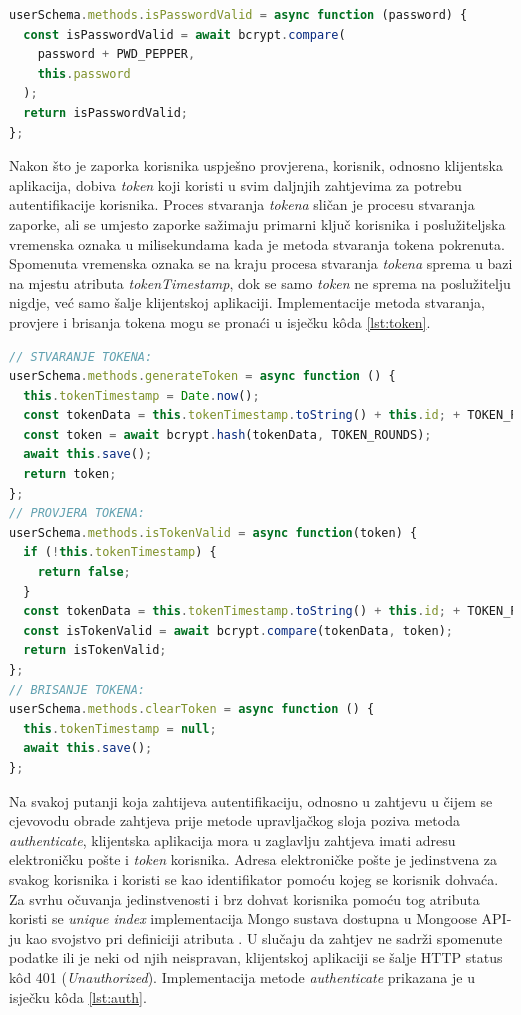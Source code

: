 \documentclass[times, utf8, diplomski, numeric]{fer}
\newcommand{\razmakp}{\vspace{18pt}}
\newcommand{\razmaks}{\vspace{10pt}}
\begin{document}
\razmakp %
\begin{lstlisting}[language=JavaScript, caption={Metoda \emph{isPasswordValid} sheme Korisnik}, label={lst:isPwd}]
userSchema.methods.isPasswordValid = async function (password) {
  const isPasswordValid = await bcrypt.compare(
    password + PWD_PEPPER,
    this.password
  );
  return isPasswordValid;
};
\end{lstlisting}
\razmaks

Nakon što je zaporka korisnika uspješno provjerena, korisnik, odnosno klijentska aplikacija, dobiva \emph{token} koji koristi u svim daljnjih zahtjevima za potrebu autentifikacije korisnika.
Proces stvaranja \emph{tokena} sličan je procesu stvaranja zaporke, ali se umjesto zaporke sažimaju primarni ključ korisnika i poslužiteljska vremenska oznaka  u milisekundama kada je metoda stvaranja tokena pokrenuta.
Spomenuta vremenska oznaka se na kraju procesa stvaranja \emph{tokena} sprema u bazi na mjestu atributa \emph{tokenTimestamp}, dok se samo \emph{token} ne sprema na poslužitelju nigdje, već samo šalje klijentskoj aplikaciji.
Implementacije metoda stvaranja, provjere i brisanja tokena mogu se pronaći u isječku kôda \ref{lst:token}.

\razmakp %
\begin{lstlisting}[language=JavaScript, caption={Metode stvaranja, provjere i brisanja tokena sheme Korisnik}, label={lst:token}]
// STVARANJE TOKENA:
userSchema.methods.generateToken = async function () {
  this.tokenTimestamp = Date.now();
  const tokenData = this.tokenTimestamp.toString() + this.id; + TOKEN_PEPPER;
  const token = await bcrypt.hash(tokenData, TOKEN_ROUNDS);
  await this.save();
  return token;
};
// PROVJERA TOKENA:
userSchema.methods.isTokenValid = async function(token) {
  if (!this.tokenTimestamp) {
    return false;
  }
  const tokenData = this.tokenTimestamp.toString() + this.id; + TOKEN_PEPPER;
  const isTokenValid = await bcrypt.compare(tokenData, token);
  return isTokenValid;
};
// BRISANJE TOKENA:
userSchema.methods.clearToken = async function () {
  this.tokenTimestamp = null;
  await this.save();
};
\end{lstlisting}
\razmaks

Na svakoj putanji koja zahtijeva autentifikaciju, odnosno u zahtjevu u čijem se cjevovodu obrade zahtjeva prije metode upravljačkog sloja poziva metoda \emph{authenticate}, klijentska aplikacija mora u zaglavlju zahtjeva imati adresu elektroničku pošte i \emph{token} korisnika.
Adresa elektroničke pošte je jedinstvena za svakog korisnika i koristi se kao identifikator pomoću kojeg se korisnik dohvaća.
Za svrhu očuvanja jedinstvenosti i brz dohvat korisnika pomoću tog atributa koristi se \emph{unique index} implementacija Mongo sustava \citep{mongo} dostupna u Mongoose API-ju kao svojstvo pri definiciji atributa \citep{mongoose}.
U slučaju da zahtjev ne sadrži spomenute podatke ili je neki od njih neispravan, klijentskoj aplikaciji se šalje HTTP status kôd 401 (\emph{Unauthorized}).
Implementacija metode \emph{authenticate} prikazana je u isječku kôda \ref{lst:auth}.
\end{document}
